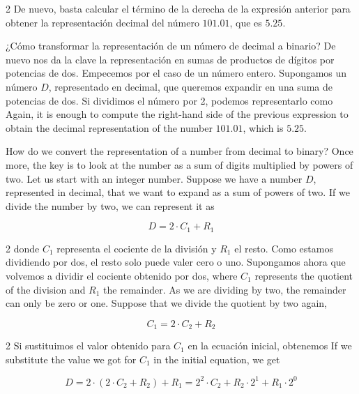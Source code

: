 \begin{paracol}{2}
De nuevo, basta calcular el término de la derecha de la expresión anterior para obtener la representación decimal del número $101.01$, que es $5.25$.

¿Cómo transformar la representación de un número de decimal a binario? De nuevo nos da la clave la representación en sumas de productos de dígitos por potencias de dos. Empecemos por el caso de un número entero. Supongamos un número $D$, representado en decimal, que queremos expandir en una suma de potencias de dos. Si dividimos el número por 2, podemos representarlo como
\switchcolumn
Again, it is enough to compute the right-hand side of the previous expression to obtain the decimal representation of the number $101.01$, which is $5.25$.

 How do we convert the representation of a number from decimal to binary? Once more, the key is to look at the number as a sum of digits multiplied by powers of two. Let us start with an integer number. Suppose we have a number $D$, represented in decimal, that we want to expand as a sum of powers of two. If we divide the number by two, we can represent it as
\end{paracol}
\begin{equation*}
D=2\cdot C_1+R_1
\end{equation*}
\begin{paracol}{2}
donde $C_1$ representa el cociente de la división y $R_1$ el resto. Como estamos dividiendo por dos, el resto solo puede valer cero o uno. Supongamos ahora que volvemos a dividir el cociente obtenido por dos,
\switchcolumn
where $C_1$ represents the quotient of the division and $R_1$ the remainder. As we are dividing by two, the remainder can only be zero or one. Suppose that we divide the quotient by two again,
\end{paracol}
 \begin{equation*}
C_1=2\cdot C_2+R_2
\end{equation*}
\begin{paracol}{2}
Si sustituimos el valor obtenido para $C_1$ en la ecuación inicial, obtenemos
\switchcolumn
If we substitute the value we got for $C_1$ in the initial equation, we get
\end{paracol}
\begin{equation*}
D=2\cdot(2\cdot C_2+R_2)+R_1= 2^2\cdot C_2+R_2\cdot 2^1+R_1\cdot 2^0
\end{equation*}
